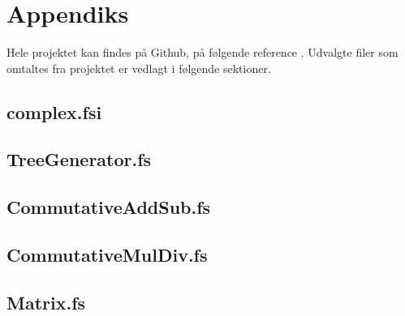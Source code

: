 \section{Appendiks}
Hele projektet kan findes på Github, på følgende reference \cite{github_repo}. Udvalgte filer som omtaltes fra projektet er vedlagt i følgende sektioner.
\subsection{complex.fsi} \label{sec:complex.fsi}



\subsection{TreeGenerator.fs} \label{sec:treeGenerator.fs}


\subsection{CommutativeAddSub.fs} \label{sec:commutativeAddSub.fs}


\subsection{CommutativeMulDiv.fs} \label{sec:commutativeMulDiv.fs}


\subsection{Matrix.fs} \label{sec:matrix.fs}

